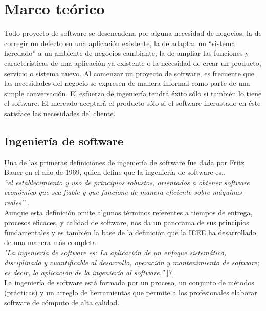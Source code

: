 \chapter{Marco teórico} \label{cap:dos}

Todo proyecto de software se desencadena por alguna necesidad de negocios: la de corregir un defecto en una aplicación existente, la de adaptar un “sistema heredado” a un ambiente de negocios cambiante, la de ampliar las funciones y características de una aplicación ya existente o la necesidad de crear un producto, servicio o sistema nuevo.
Al comenzar un proyecto de software, es frecuente que las necesidades del negocio se expresen de manera informal como parte de una simple conversación.  El esfuerzo de ingeniería tendrá éxito sólo si también lo tiene el software. El mercado aceptará el producto sólo si el software incrustado en éste satisface las necesidades del cliente.

\section{Ingeniería de software}

Una de las primeras definiciones de ingeniería de software fue dada por Fritz Bauer en el año de 1969, quien define que la ingeniería de software es..\\

	\textit {“el establecimiento y uso de principios robustos, orientados a obtener software económico que sea fiable y que funcione de manera eficiente sobre máquinas reales” }. \\
	
  Aunque esta definición omite algunos términos referentes a tiempos de entrega, procesos eficaces, y calidad de software, nos da un panorama de sus principios fundamentales y es también la base de la definición que la IEEE ha desarrollado de una manera más completa: \\

 \textit {"La ingeniería de software es: La aplicación de un enfoque sistemático, disciplinado y cuantificable al desarrollo, operación y mantenimiento de software; es decir, la aplicación de la ingeniería al software.”}  \hyperlink{b07}{[7]}\\

La ingeniería de software está formada por un proceso, un conjunto de métodos (prácticas) y un arreglo de herramientas que permite a los profesionales elaborar software de cómputo de alta calidad. 

